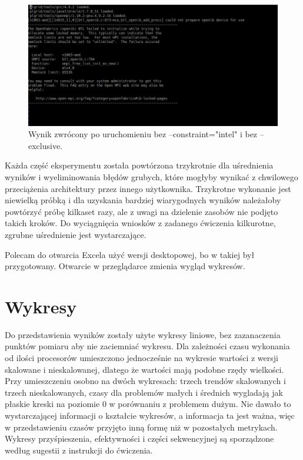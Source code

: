 \documentclass[10pt,english, openany]{book}
\begin{document}
\begin{figure}[h]
\centering
\includegraphics[scale=0.7]{pics/error_2.png}
\caption{Wynik zwrócony po uruchomieniu bez --constraint="intel" i bez --exclusive.}
\end{figure}

Każda część eksperymentu została powtórzona trzykrotnie dla uśrednienia wyników i wyeliminowania błędów grubych, które mogłyby wynikać z chwilowego przeciążenia architektury przez innego użytkownika. Trzykrotne wykonanie jest niewielką próbką i dla uzyskania bardziej wiarygodnych wyników należałoby powtórzyć próbę kilkaset razy, ale z uwagi na dzielenie zasobów nie podjęto takich kroków. Do wyciągnięcia wniosków z zadanego ćwiczenia kilkurotne, zgrubne uśrednienie jest wystarczające. 

Polecam do otwarcia Excela użyć wersji desktopowej, bo w takiej był przygotowany. Otwarcie w przeglądarce zmienia wygląd wykresów.

\chapter{Wykresy}
Do przedstawienia wyników zostały użyte wykresy liniowe, bez zazanaczenia punktów pomiaru aby nie zaciemniać wykresu. Dla zależności czasu wykonania od ilości procesorów umieszczono jednocześnie na wykresie wartości z wersji skalowane i nieskalowanej, dlatego że wartości mają podobne rzędy wielkości. Przy umieszczeniu osobno na dwóch wykresach: trzech trendów skalowanych i trzech nieskalowanych, czasy dla problemów małych i średnich wygladają jak płaskie kreski na poziomie 0 w porównaniu z problemem dużym. Nie dawało to wystarczającej informacji o kształcie wykresów, a informacja ta jest ważna, więc w przedstawieniu czasów przyjęto inną formę niż w pozostałych metrykach. Wykresy przyśpieszenia, efektywności i części sekwencyjnej są sporządzone według sugestii z instrukcji do ćwiczenia.
\end{document}
